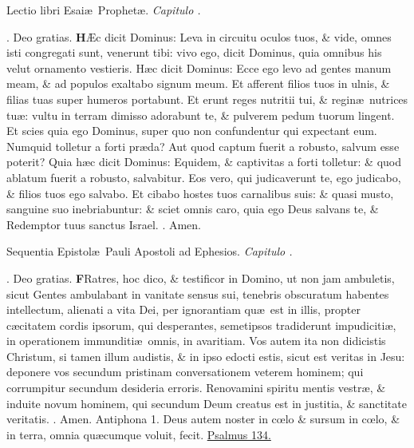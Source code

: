 \documentclass[letter,11pt]{book}
\makeatletter
\DeclareRobustCommand{\Rbar}{\vers@resp{0pt}{R}}
\newcommand{\vers@resp@sym}{\raisebox{0.2ex}{\rotatebox[origin=c]{-20}{$\m@th\rceil$}}}
\newcommand{\vers@resp}[2]{%
  {\ooalign{\hidewidth\kern#1\vers@resp@sym\hidewidth\cr#2\cr}}%
}%
\def\R{\color{Red} \Rbar . \color{black}}
\makeatother
\begin{document}
\begin{multicols*}{2}
\vspace{-.5em} \begin{center} {\color{Red} L}ectio libri Esai\ae \ Prophet\ae . \itshape Capitulo . \color{black} \end{center} \vspace{-.5em}
\par \noindent \R Deo gratias.
\lettrine[lines=2]{\bfseries \color{Red} H}{}\AE c dicit Dominus: Leva in circuitu oculos tuos, \& vide, omnes isti congregati sunt, venerunt tibi: vivo ego, dicit Dominus, quia omnibus his velut ornamento vestieris. H\ae c dicit Dominus: Ecce ego levo ad gentes manum meam, \& ad populos exaltabo signum meum. Et afferent filios tuos in ulnis, \& filias tuas super humeros portabunt. Et erunt reges nutritii tui, \& regin\ae \ nutrices tu\ae : vultu in terram dimisso adorabunt te, \& pulverem pedum tuorum lingent. Et scies quia ego Dominus, super quo non confundentur qui expectant eum. Numquid tolletur a forti pr\ae da? Aut quod captum fuerit a robusto, salvum esse poterit? Quia h\ae c dicit Dominus: Equidem, \& captivitas a forti tolletur: \& quod ablatum fuerit a robusto, salvabitur. Eos vero, qui judicaverunt te, ego judicabo, \& filios tuos ego salvabo. Et cibabo hostes tuos carnalibus suis: \& quasi musto, sanguine suo inebriabuntur: \& sciet omnis caro, quia ego Deus salvans te, \& Redemptor tuus sanctus Israel. \R Amen.
\vspace{-.5em} \begin{center} {\color{Red} S}equentia Epistol\ae \ Pauli Apostoli ad Ephesios. \itshape Capitulo . \color{black} \end{center} \vspace{-.5em}
\par \noindent \R Deo gratias.
\lettrine[lines=2]{\bfseries \color{Red} F}{}Ratres, hoc dico, \& testificor in Domino, ut non jam ambuletis, sicut Gentes ambulabant in vanitate sensus sui, tenebris obscuratum habentes intellectum, alienati a vita Dei, per ignorantiam qu\ae \ est in illis, propter c\ae citatem cordis ipsorum,
qui desperantes, semetipsos tradiderunt impudiciti\ae , in operationem immunditi\ae \ omnis, in avaritiam. Vos autem ita non didicistis Christum, si tamen illum audistis, \& in ipso edocti estis, sicut est veritas in Jesu: deponere vos secundum pristinam conversationem veterem hominem; qui corrumpitur secundum desideria erroris. Renovamini spiritu mentis vestr\ae , \& induite novum hominem, qui secundum Deum creatus est in justitia, \& sanctitate veritatis. \R Amen.
\newline \color{Red} Antiphona 1. \color{black} Deus autem noster in c\oe lo \& sursum in c\oe lo, \& in terra, omnia qu\ae cumque voluit, fecit. \color{Red} \hyperlink{ps134}{Psalmus 134.} \color{black}

\end{multicols*}
\end{document}
